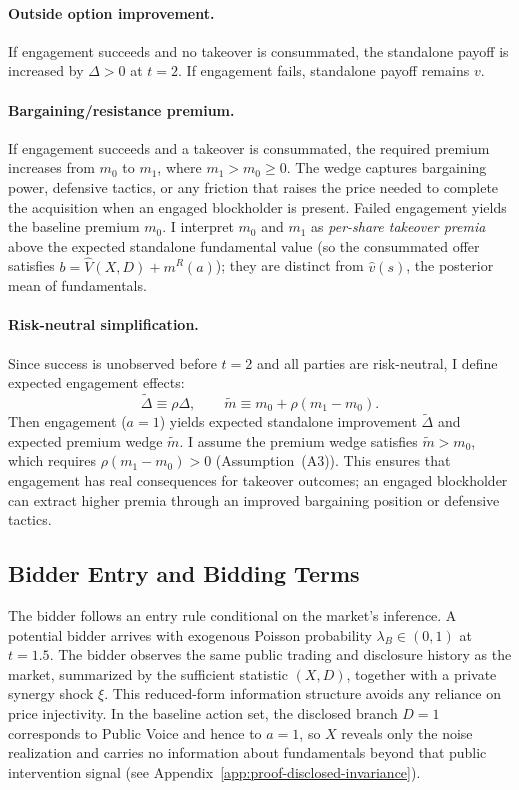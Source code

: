 \documentclass[11pt]{article}
\newcommand{\1}{\mathbf{1}}
\begin{document}
\paragraph{Outside option improvement.} If engagement succeeds and no takeover is consummated, the standalone payoff is increased by $\Delta > 0$ at $t=2$. If engagement fails, standalone payoff remains $v$.

\paragraph{Bargaining/resistance premium.} If engagement succeeds and a takeover is consummated, the required premium increases from $m_0$ to $m_1$, where $m_1 > m_0 \geq 0$. The wedge captures bargaining power, defensive tactics, or any friction that raises the price needed to complete the acquisition when an engaged blockholder is present. Failed engagement yields the baseline premium $m_0$.
I interpret $m_0$ and $m_1$ as \emph{per-share takeover premia} above the expected standalone fundamental value (so the consummated offer satisfies $b=\hat{V}(X,D)+m^{R}(a)$); they are distinct from $\hat{v}(s)$, the posterior mean of fundamentals.

\paragraph{Risk-neutral simplification.} Since success is unobserved before $t=2$ and all parties are risk-neutral, I define expected engagement effects:
\[
\tilde{\Delta} \equiv \rho \Delta, \qquad \tilde{m} \equiv m_0 + \rho(m_1 - m_0).
\]
Then engagement ($a=1$) yields expected standalone improvement $\tilde{\Delta}$ and expected premium wedge $\tilde{m}$. I assume the premium wedge satisfies $\tilde{m} > m_0$, which requires $\rho(m_1 - m_0) > 0$ (Assumption~\textup{(A3)}). This ensures that engagement has real consequences for takeover outcomes; an engaged blockholder can extract higher premia through an improved bargaining position or defensive tactics.

%
\subsection{Bidder Entry and Bidding Terms}
%

The bidder follows an entry rule conditional on the market's inference. A potential bidder arrives with exogenous Poisson probability $\lambda_B \in (0,1)$ at $t=1.5$. The bidder observes the same public trading and disclosure history as the market, summarized by the sufficient statistic $(X,D)$, together with a private synergy shock $\xi$. This reduced-form information structure avoids any reliance on price injectivity. In the baseline action set, the disclosed branch $D=1$ corresponds to Public Voice and hence to $a=1$, so $X$ reveals only the noise realization and carries no information about fundamentals beyond that public intervention signal (see Appendix~\ref{app:proof-disclosed-invariance}).
\end{document}

